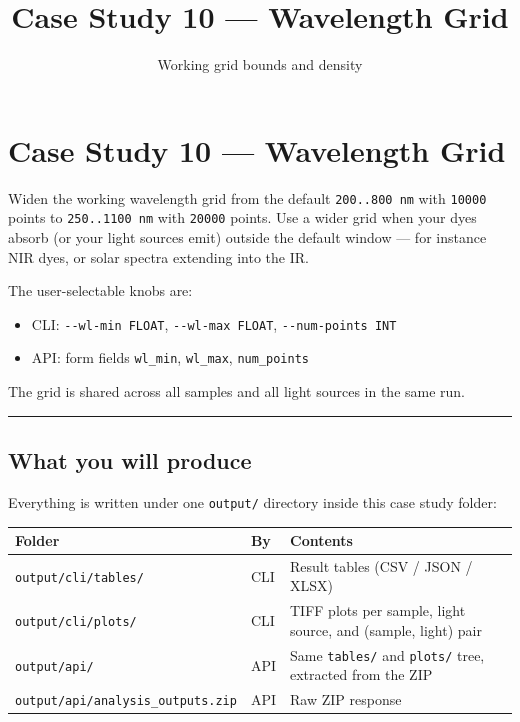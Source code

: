 \documentclass[
  11pt,
]{article}
\title{Case Study 10 — Wavelength Grid}
\subtitle{Working grid bounds and density}
\author{}
\date{}
\providecommand{\tightlist}{
  \setlength{\itemsep}{0pt}\setlength{\parskip}{0pt}}
\begin{document}
\maketitle

{
\hypersetup{linkcolor=}
\setcounter{tocdepth}{2}
\tableofcontents
}
\hypertarget{case-study-10--wavelength-grid}{
\section{Case Study 10 --- Wavelength
Grid}\label{case-study-10--wavelength-grid}}

Widen the working wavelength grid from the default \texttt{200..800\ nm}
with \texttt{10000} points to \texttt{250..1100\ nm} with \texttt{20000}
points. Use a wider grid when your dyes absorb (or your light sources
emit) outside the default window --- for instance NIR dyes, or solar
spectra extending into the IR.

The user-selectable knobs are:

\begin{itemize}
\tightlist
\item
  CLI: \texttt{-\/-wl-min\ FLOAT}, \texttt{-\/-wl-max\ FLOAT},
  \texttt{-\/-num-points\ INT}
\item
  API: form fields \texttt{wl\_min}, \texttt{wl\_max},
  \texttt{num\_points}
\end{itemize}

The grid is shared across all samples and all light sources in the same
run.

\begin{center}\rule{0.5\linewidth}{0.5pt}\end{center}

\hypertarget{what-you-will-produce}{
\subsection{What you will produce}\label{what-you-will-produce}}

Everything is written under one \texttt{output/} directory inside this
case study folder:

\begin{longtable}[]{@{}lll@{}}
\toprule
Folder & By & Contents \\
\midrule
\endhead
\texttt{output/cli/tables/} & CLI & Result tables (CSV / JSON / XLSX) \\
\texttt{output/cli/plots/} & CLI & TIFF plots per sample, light source,
and (sample, light) pair \\
\texttt{output/api/} & API & Same \texttt{tables/} and \texttt{plots/}
tree, extracted from the ZIP \\
\texttt{output/api/analysis\_outputs.zip} & API & Raw ZIP response \\
\bottomrule
\end{longtable}
\end{document}

